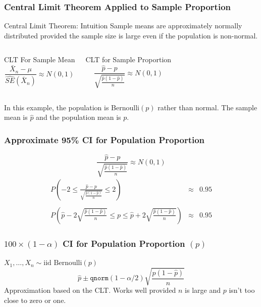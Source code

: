 \documentclass{beamer}
\begin{document}
\begin{frame}
\frametitle{Central Limit Theorem Applied to Sample Proportion}

\begin{alertblock}{Central Limit Theorem: Intuition}
Sample means are approximately normally distributed provided the sample size is large even if the population is non-normal.
\end{alertblock}

\begin{columns}

\begin{block}{CLT For Sample Mean}
$$\frac{\bar{X}_n -\mu}{\widehat{SE}(\bar{X}_n)} \approx N(0,1)$$
\end{block}

\begin{block}{CLT for Sample Proportion}
$$\frac{\widehat{p} -p}{\sqrt{\frac{\widehat{p}(1-\widehat{p})}{n}}} \approx N(0,1)$$
\end{block}
\end{columns}

\vspace{1em}
In this example, the population is Bernoulli$(p)$ rather than normal. The sample mean is $\widehat{p}$ and the population mean is $p$.

\end{frame}

\begin{frame}
\frametitle{Approximate 95\% CI for Population Proportion}
$$\frac{\widehat{p} -p}{\sqrt{\frac{\widehat{p}(1-\widehat{p})}{n}}} \approx N(0,1)$$ 
	\begin{eqnarray*}
		P\left(-2 \leq\frac{\widehat{p} -p}{\sqrt{\frac{\widehat{p}(1-\widehat{p})}{n}}} \leq  2\right) &\approx& 0.95\\ \\ 
		P\left(\widehat{p} - 2 \sqrt{\frac{\widehat{p}(1-\widehat{p})}{n}} \leq p \leq \widehat{p} + 2\sqrt{\frac{\widehat{p}(1-\widehat{p})}{n}}\right) &\approx& 0.95
	\end{eqnarray*}
\end{frame}

\begin{frame}
\frametitle{$100\times(1-\alpha)$ CI for Population Proportion $(p)$}
$X_1, \hdots, X_n \sim \mbox{iid Bernoulli}(p)$
	$$\widehat{p} \pm \texttt{qnorm}(1-\alpha/2) \sqrt{\frac{\widehat{p}(1-\widehat{p})}{n}}$$
	\alert{Approximation based on the CLT. Works well provided $n$ is large and $p$ isn't too close to zero or one.}
\end{frame}
\end{document}
